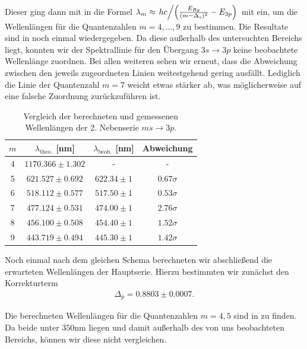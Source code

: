 Dieser ging dann mit in die Formel $\lambda_m \approx \flatfrac{hc}{\qty(\frac{E_{Ry}}{(m - \Delta_s)^2} - E_{3p})}$ mit ein, um die Wellenlängen für die Quantenzahlen $m=4,\dots,9$ zu bestimmen. Die Resultate sind in  noch einmal wiedergegeben. Da diese außerhalb des untersuchten Bereichs liegt, konnten wir der Spektrallinie für den Übergang $3s\to3p$ keine beobachtete Wellenlänge zuordnen. Bei allen weiteren sehen wir erneut, dass die Abweichung zwischen den jeweils zugeordneten Linien weitestgehend gering ausfällt. Lediglich die Linie der Quantenzahl $m=7$ weicht etwas stärker ab, was möglicherweise auf eine falsche Zuordnung zurückzuführen ist.

\begin{table}[H]
  \centering
  \caption{Vergleich der berechneten und gemessenen Wellenlängen der 2. Nebenserie $ms \to 3p$.}
  \vspace*{0.5em}
  \begin{tabular}{c c c c}
      \hline
      $m$ & $\lambda_{\text{theo.}}$ [nm] & $\lambda_{\text{beob.}}$ [nm] & Abweichung \\
      \hline
      4  & $1170.366 \pm 1.302$ & -     & -     \\
      5  & $621.527 \pm 0.692$  & $622.34 \pm 1$ & $0.67\sigma$ \\
      6  & $518.112 \pm 0.577$  & $517.50 \pm 1$ & $0.53\sigma$ \\
      7  & $477.124 \pm 0.531$  & $474.00 \pm 1$ & $2.76\sigma$ \\
      8  & $456.100 \pm 0.508$  & $454.40 \pm 1$ & $1.52\sigma$ \\
      9  & $443.719 \pm 0.494$  & $445.30 \pm 1$ & $1.42\sigma$ \\
      \hline
  \end{tabular}
  \label{tab:wellenlaengen_2ns_zsmf}
\end{table}

Noch einmal nach dem gleichen Schema berechneten wir abschließend die erwarteten Wellenlängen der Hauptserie. Hierzu bestimmten wir zunächst den Korrekturterm
\begin{align}
  \Delta_p = 0.8803 \pm 0.0007.
\end{align}

Die berechneten Wellenlängen für die Quantenzahlen $m=4,5$ sind in  zu finden. Da beide unter $350\si{\nano\meter}$ liegen und damit außerhalb des von uns beobachteten Bereichs, können wir diese nicht vergleichen.

